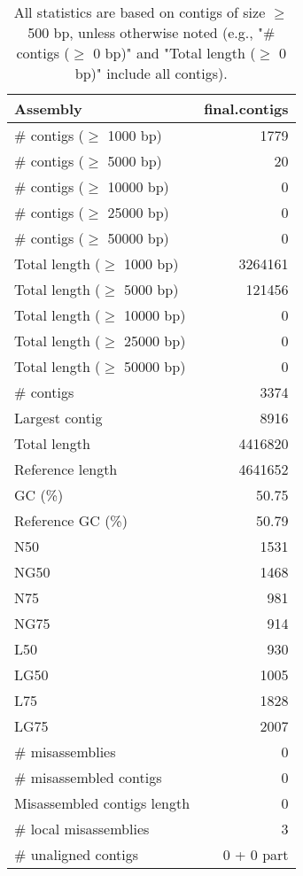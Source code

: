\documentclass[12pt,a4paper]{article}
\begin{document}
\begin{table}[ht]
\begin{center}
\caption{All statistics are based on contigs of size $\geq$ 500 bp, unless otherwise noted (e.g., "\# contigs ($\geq$ 0 bp)" and "Total length ($\geq$ 0 bp)" include all contigs).}
\begin{tabular}{|l*{1}{|r}|}
\hline
Assembly & final.contigs \\ \hline
\# contigs ($\geq$ 1000 bp) & 1779 \\ \hline
\# contigs ($\geq$ 5000 bp) & 20 \\ \hline
\# contigs ($\geq$ 10000 bp) & 0 \\ \hline
\# contigs ($\geq$ 25000 bp) & 0 \\ \hline
\# contigs ($\geq$ 50000 bp) & 0 \\ \hline
Total length ($\geq$ 1000 bp) & 3264161 \\ \hline
Total length ($\geq$ 5000 bp) & 121456 \\ \hline
Total length ($\geq$ 10000 bp) & 0 \\ \hline
Total length ($\geq$ 25000 bp) & 0 \\ \hline
Total length ($\geq$ 50000 bp) & 0 \\ \hline
\# contigs & 3374 \\ \hline
Largest contig & 8916 \\ \hline
Total length & 4416820 \\ \hline
Reference length & 4641652 \\ \hline
GC (\%) & 50.75 \\ \hline
Reference GC (\%) & 50.79 \\ \hline
N50 & 1531 \\ \hline
NG50 & 1468 \\ \hline
N75 & 981 \\ \hline
NG75 & 914 \\ \hline
L50 & 930 \\ \hline
LG50 & 1005 \\ \hline
L75 & 1828 \\ \hline
LG75 & 2007 \\ \hline
\# misassemblies & 0 \\ \hline
\# misassembled contigs & 0 \\ \hline
Misassembled contigs length & 0 \\ \hline
\# local misassemblies & 3 \\ \hline
\# unaligned contigs & 0 + 0 part \\ \hline

\end{tabular}
\end{center}
\end{table}
\end{document}
